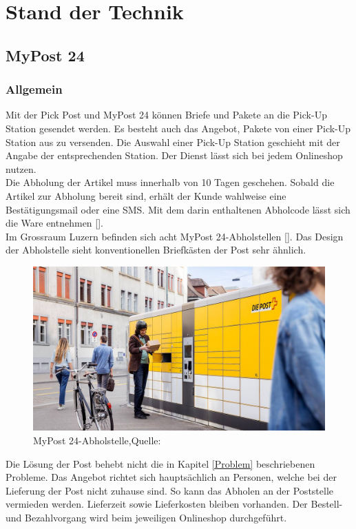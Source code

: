 \section{Stand der Technik}\label{StandDerTechnik}
\subsection{MyPost 24}
\subsubsection{Allgemein}
Mit der Pick Post und MyPost 24 können Briefe und Pakete an die Pick-Up Station gesendet werden. Es besteht auch das Angebot, Pakete von einer Pick-Up Station aus zu versenden. 
Die Auswahl einer Pick-Up Station geschieht mit der Angabe der entsprechenden Station. Der Dienst lässt sich bei jedem Onlineshop nutzen.\\
Die Abholung der Artikel muss innerhalb von 10 Tagen geschehen. Sobald die Artikel zur Abholung bereit sind, erhält der Kunde wahlweise eine Bestätigungsmail oder eine SMS. Mit dem darin enthaltenen Abholcode lässt sich die Ware entnehmen [\cite{postPickUp}].\\

Im Grossraum Luzern befinden sich acht MyPost 24-Abholstellen [\cite{myPost24Stations}]. 
Das Design der Abholstelle sieht konventionellen Briefkästen der Post sehr ähnlich. 
\begin{figure}[H]
	\centering
	\includegraphics[width=1\textwidth]{images/myPostImage.jpg}
	\caption[MyPost 24-Abholstelle]{MyPost 24-Abholstelle,Quelle: \cite{myPost24StationsImage}}
	\label{img: My Post 24-Abholstelle}
\end{figure}
Die Lösung der Post behebt nicht die in Kapitel \ref{Problem} beschriebenen Probleme. Das Angebot richtet sich hauptsächlich an Personen, welche bei der Lieferung der Post nicht zuhause sind. So kann das Abholen an der Poststelle vermieden werden. Lieferzeit sowie Lieferkosten bleiben vorhanden. Der Bestell- und Bezahlvorgang wird beim jeweiligen Onlineshop durchgeführt. 
\newpage 
